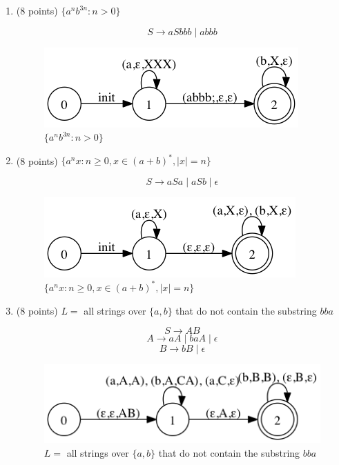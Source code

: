 \documentclass[paper=a4, fontsize=11pt]{scrartcl} %
\begin{document}
\begin{enumerate}
\item
  \begin{fancyquotes}
    (8 points) $\{a^nb^{3n} : n>0\}$
  \end{fancyquotes}

  $$S\rightarrow aSbbb \mid abbb$$

  \begin{figure}[H]
    \centering
    \includegraphics[scale=.7]{5-1.gv.png}
    \caption{$\{a^nb^{3n} : n>0\}$}
  \end{figure}

\item
  \begin{fancyquotes}
    (8 points) $\{a^nx : n\geq 0, x \in (a+b)^*, |x| = n \}$
  \end{fancyquotes}

  $$S\rightarrow aSa \mid aSb \mid \epsilon$$

  \begin{figure}[H]
    \centering
    \includegraphics[scale=.7]{5-1.gv.2.png}
    \caption{$\{a^nx : n\geq 0, x \in (a+b)^*, |x| = n \}$}
  \end{figure}

\item
  \begin{fancyquotes}
    (8 points) $L =$ all strings over $\{a,b\}$ that do not contain
    the substring $bba$
  \end{fancyquotes}

  $$S\rightarrow AB$$
  $$A\rightarrow aA \mid baA \mid \epsilon$$
  $$B\rightarrow bB \mid \epsilon$$

  \begin{figure}[H]
    \centering
    \includegraphics[scale=.7]{5-1.gv.3.png}
    \caption{$L =$ all strings over $\{a,b\}$ that do not contain the
      substring $bba$}
  \end{figure}


\end{enumerate}
\end{document}
